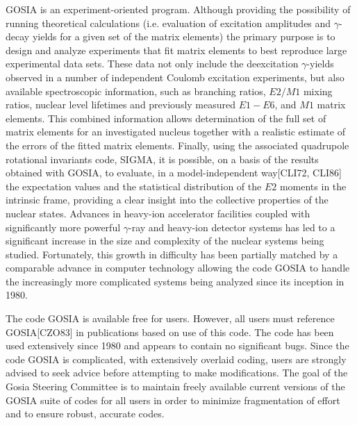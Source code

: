 \documentclass[10pt]{article}
\begin{document}
GOSIA is an experiment-oriented program. Although providing the possibility of running theoretical calculations (i.e. evaluation of excitation amplitudes and $\gamma$-decay yields for a given set of the matrix elements) the primary purpose is to design and analyze experiments that fit matrix elements to best reproduce large experimental data sets. These data not only include the deexcitation $\gamma$-yields observed in a number of independent Coulomb excitation experiments, but also available spectroscopic information, such as branching ratios, $E 2 / M 1$ mixing ratios, nuclear level lifetimes and previously measured $E 1-E 6$, and $M 1$ matrix elements. This combined information allows determination of the full set of matrix elements for an investigated nucleus together with a realistic estimate of the errors of the fitted matrix elements. Finally, using the associated quadrupole rotational invariants code, SIGMA, it is possible, on a basis of the results obtained with GOSIA, to evaluate, in a model-independent way[CLI72, CLI86] the expectation values and the statistical distribution of the $E 2$ moments in the intrinsic frame, providing a clear insight into the collective properties of the nuclear states. Advances in heavy-ion accelerator facilities coupled with significantly more powerful $\gamma$-ray and heavy-ion detector systems has led to a significant increase in the size and complexity of the nuclear systems being studied. Fortunately, this growth in difficulty has been partially matched by a comparable advance in computer technology allowing the code GOSIA to handle the increasingly more complicated systems being analyzed since its inception in 1980.

The code GOSIA is available free for users. However, all users must reference GOSIA[CZO83] in publications based on use of this code. The code has been used extensively since 1980 and appears to contain no significant bugs. Since the code GOSIA is complicated, with extensively overlaid coding, users are strongly advised to seek advice before attempting to make modifications. The goal of the Gosia Steering Committee is to maintain freely available current versions of the GOSIA suite of codes for all users in order to minimize fragmentation of effort and to ensure robust, accurate codes.
\end{document}
